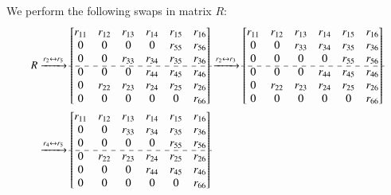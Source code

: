 \documentclass[1p]{elsarticle}
\numberwithin{equation}{section}
\begin{document}
We  perform the following swaps in matrix $R$:
\begin{align*}
R
& \xrightarrow{r_{2} \leftrightarrow r_{5}}
\begin{bmatrix}
 r_{11} & r_{12} & r_{13} & r_{14} & r_{15} & r_{16}\\
 0      & 0      & 0      & 0      & r_{55} & r_{56}\\
 0      & 0      & r_{33} & r_{34} & r_{35} & r_{36}\\
 \cdashline{1-6}
 0      & 0      & 0 & r_{44} & r_{45} & r_{46}\\
 0 & r_{22} & r_{23} & r_{24} & r_{25} & r_{26}\\
 0      & 0      & 0      & 0      & 0 & r_{66}\\
\end{bmatrix}
\xrightarrow{r_{2} \leftrightarrow r_{3}}
\begin{bmatrix}
 r_{11} & r_{12} & r_{13} & r_{14} & r_{15} & r_{16}\\
 0      & 0      & r_{33} & r_{34} & r_{35} & r_{36}\\
 0      & 0      & 0      & 0      & r_{55} & r_{56}\\
 \cdashline{1-6}
 0      & 0      & 0 & r_{44} & r_{45} & r_{46}\\
 0 & r_{22} & r_{23} & r_{24} & r_{25} & r_{26}\\
 0      & 0      & 0      & 0      & 0 & r_{66}\\
\end{bmatrix} \\
& \xrightarrow{r_{4} \leftrightarrow r_{5}}
\begin{bmatrix}
 r_{11} & r_{12} & r_{13} & r_{14} & r_{15} & r_{16}\\
 0      & 0      & r_{33} & r_{34} & r_{35} & r_{36}\\
 0      & 0      & 0      & 0      & r_{55} & r_{56}\\
 \cdashline{1-6}
 0 & r_{22} & r_{23} & r_{24} & r_{25} & r_{26}\\
 0      & 0      & 0 & r_{44} & r_{45} & r_{46}\\
 0      & 0      & 0      & 0      & 0 & r_{66}\\

\end{bmatrix}
\end{align*}
\end{document}
